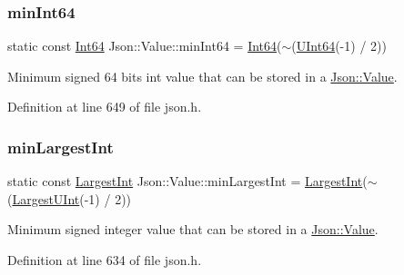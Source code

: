 \hypertarget{class_json_1_1_value_a4188810a086c06bbafc12968b36c999f}{}\label{class_json_1_1_value_a4188810a086c06bbafc12968b36c999f} 
\subsubsection{\texorpdfstring{min\+Int64}{minInt64}}
{\footnotesize\ttfamily static const \hyperlink{class_json_1_1_value_a1b86af9f85f0f1baa972c3319fa22695}{Int64} Json\+::\+Value\+::min\+Int64 = \hyperlink{class_json_1_1_value_a1b86af9f85f0f1baa972c3319fa22695}{Int64}($\sim$(\hyperlink{class_json_1_1_value_a8b62564be8c087c6d18de180ff4e13e3}{U\+Int64}(-\/1) / 2))\hspace{0.3cm}{\ttfamily [static]}}



Minimum signed 64 bits int value that can be stored in a \hyperlink{class_json_1_1_value}{Json\+::\+Value}. 



Definition at line 649 of file json.\+h.

\hypertarget{class_json_1_1_value_a012028a98f360f6e02475baa4e48175e}{}\label{class_json_1_1_value_a012028a98f360f6e02475baa4e48175e} 
\subsubsection{\texorpdfstring{min\+Largest\+Int}{minLargestInt}}
{\footnotesize\ttfamily static const \hyperlink{class_json_1_1_value_a1cbb82642ed05109b9833e49f042ece7}{Largest\+Int} Json\+::\+Value\+::min\+Largest\+Int = \hyperlink{class_json_1_1_value_a1cbb82642ed05109b9833e49f042ece7}{Largest\+Int}($\sim$(\hyperlink{class_json_1_1_value_a6682a3684d635e03fc06ba229fa24eec}{Largest\+U\+Int}(-\/1) / 2))\hspace{0.3cm}{\ttfamily [static]}}



Minimum signed integer value that can be stored in a \hyperlink{class_json_1_1_value}{Json\+::\+Value}. 



Definition at line 634 of file json.\+h.

\hypertarget{class_json_1_1_value_a0fb5f64cef1500c21b70c82c79ae742d}{}\label{class_json_1_1_value_a0fb5f64cef1500c21b70c82c79ae742d} 

